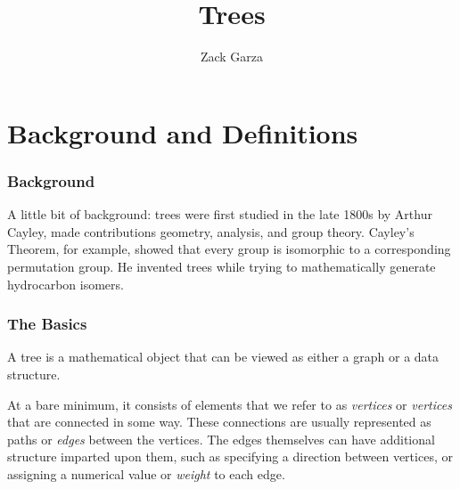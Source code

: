 \documentclass[a4paper,10pt]{report}
\title{Trees}
\author{Zack Garza}
\begin{document}
\maketitle

\begin{abstract}
\tableofcontents
\end{abstract}

\chapter{Background and Definitions}

\subsection{Background}
A little bit of background: trees were first studied in the late 1800s by Arthur Cayley, made contributions geometry, analysis, and group theory. Cayley's Theorem, for example, showed that every group is isomorphic to a corresponding permutation group. He invented trees while trying to mathematically generate hydrocarbon isomers.

\subsection{The Basics}

A tree is a mathematical object that can be viewed as either a graph or a data structure.

At a bare minimum, it consists of elements that we refer to as \textit{vertices} or \textit{vertices} that are connected in some way. These connections are usually represented as paths or \textit{edges} between the vertices. The edges themselves can have additional structure imparted upon them, such as specifying a direction between vertices, or assigning a numerical value or \textit{weight} to each edge.
\end{document}
